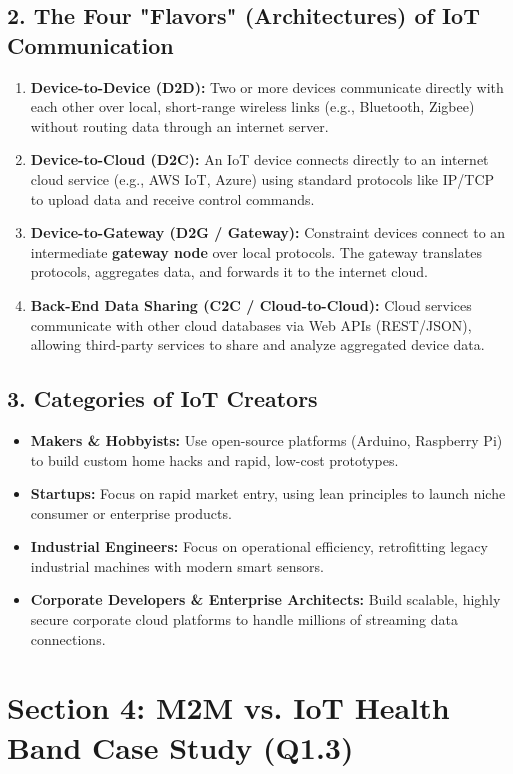 \subsection{2. The Four "Flavors" (Architectures) of IoT Communication}
\begin{enumerate}
  \item \textbf{Device-to-Device (D2D):} Two or more devices communicate directly with each other over local, short-range wireless links (e.g., Bluetooth, Zigbee) without routing data through an internet server.
  \item \textbf{Device-to-Cloud (D2C):} An IoT device connects directly to an internet cloud service (e.g., AWS IoT, Azure) using standard protocols like IP/TCP to upload data and receive control commands.
  \item \textbf{Device-to-Gateway (D2G / Gateway):} Constraint devices connect to an intermediate \textbf{gateway node} over local protocols. The gateway translates protocols, aggregates data, and forwards it to the internet cloud.
  \item \textbf{Back-End Data Sharing (C2C / Cloud-to-Cloud):} Cloud services communicate with other cloud databases via Web APIs (REST/JSON), allowing third-party services to share and analyze aggregated device data.
\end{enumerate}

\subsection{3. Categories of IoT Creators}
\begin{itemize}
  \item   \textbf{Makers \& Hobbyists:} Use open-source platforms (Arduino, Raspberry Pi) to build custom home hacks and rapid, low-cost prototypes.
  \item   \textbf{Startups:} Focus on rapid market entry, using lean principles to launch niche consumer or enterprise products.
  \item   \textbf{Industrial Engineers:} Focus on operational efficiency, retrofitting legacy industrial machines with modern smart sensors.
  \item   \textbf{Corporate Developers \& Enterprise Architects:} Build scalable, highly secure corporate cloud platforms to handle millions of streaming data connections.
\end{itemize}


\section{Section 4: M2M vs. IoT Health Band Case Study (Q1.3)}

